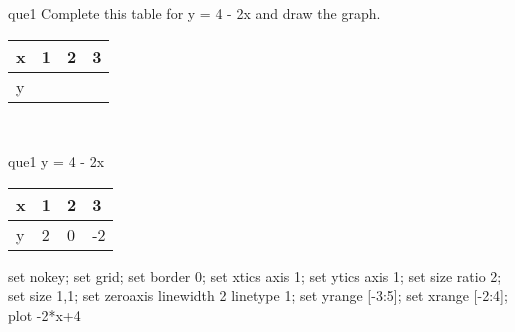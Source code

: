 \documentclass[13.5pt, varwidth=true]{beamer}
\begin{document}
\begin{frame}[shrink=19,fragile]
	\begin{beamercolorbox}[rounded=true, left, shadow=true,wd=14.8cm]{que1}
		 Complete this table for y = 4 - 2x and draw the graph. \\[0.3cm] \renewcommand{\arraystretch}{1.2}\begin{tabular}{|C|C|C|C|} \hline x & 1 & 2 & 3 \\ \hline y & & & \\ \hline \end{tabular}\\[0.3cm]
	\end{beamercolorbox}
\end{frame}
\begin{frame}[shrink=19,fragile]
	\begin{beamercolorbox}[rounded=true, left, shadow=true,wd=14.8cm]{que1}
		y = 4 - 2x\renewcommand{\arraystretch}{1.2}\begin{tabular}{|C|C|C|C|} \hline x & 1 & 2 & 3 \\ \hline y & 2 & 0 & -2\\ \hline \end{tabular}\begin{gnuplot}[terminal=pdf] set nokey; set grid; set border 0; set xtics axis 1; set ytics axis 1; set size ratio 2; set size 1,1; set zeroaxis linewidth 2 linetype 1; set yrange [-3:5]; set xrange [-2:4]; plot -2*x+4 \end{gnuplot}
	\end{beamercolorbox}
\end{frame}
\end{document}
